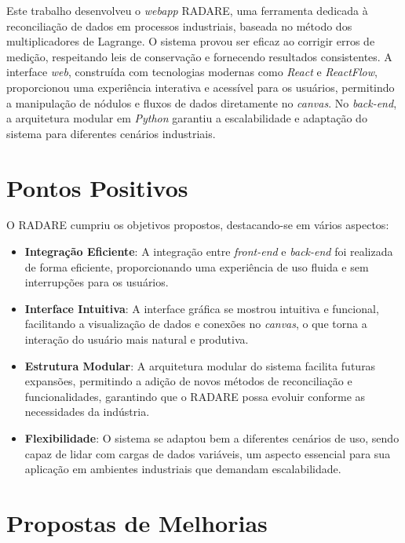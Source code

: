 \label{Cap:Conclusao}

Este trabalho desenvolveu o \textit{webapp} RADARE, uma ferramenta dedicada à reconciliação de dados em processos industriais, baseada no método dos multiplicadores de Lagrange. O sistema provou ser eficaz ao corrigir erros de medição, respeitando leis de conservação e fornecendo resultados consistentes. A interface \textit{web}, construída com tecnologias modernas como \textit{React} e \textit{ReactFlow}, proporcionou uma experiência interativa e acessível para os usuários, permitindo a manipulação de nódulos e fluxos de dados diretamente no \textit{canvas}. No \textit{back-end}, a arquitetura modular em \textit{Python} garantiu a escalabilidade e adaptação do sistema para diferentes cenários industriais.

\section{Pontos Positivos}

O RADARE cumpriu os objetivos propostos, destacando-se em vários aspectos:

\begin{itemize}
    \item \textbf{Integração Eficiente}: A integração entre \textit{front-end} e \textit{back-end} foi realizada de forma eficiente, proporcionando uma experiência de uso fluida e sem interrupções para os usuários.
    
    \item \textbf{Interface Intuitiva}: A interface gráfica se mostrou intuitiva e funcional, facilitando a visualização de dados e conexões no \textit{canvas}, o que torna a interação do usuário mais natural e produtiva.
    
    \item \textbf{Estrutura Modular}: A arquitetura modular do sistema facilita futuras expansões, permitindo a adição de novos métodos de reconciliação e funcionalidades, garantindo que o RADARE possa evoluir conforme as necessidades da indústria.
    
    \item \textbf{Flexibilidade}: O sistema se adaptou bem a diferentes cenários de uso, sendo capaz de lidar com cargas de dados variáveis, um aspecto essencial para sua aplicação em ambientes industriais que demandam escalabilidade.
\end{itemize}


\section{Propostas de Melhorias}

